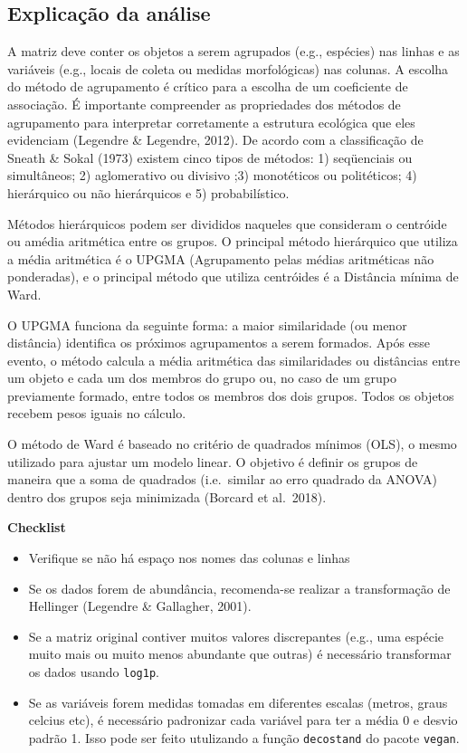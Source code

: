\documentclass[
]{book}
\providecommand{\tightlist}{%
  \setlength{\itemsep}{0pt}\setlength{\parskip}{0pt}}
\begin{document}
\hypertarget{explicauxe7uxe3o-da-anuxe1lise}{%
\subsection{Explicação da análise}\label{explicauxe7uxe3o-da-anuxe1lise}}

A matriz deve conter os objetos a serem agrupados (e.g., espécies) nas linhas e as variáveis (e.g., locais de coleta ou medidas morfológicas) nas colunas.
A escolha do método de agrupamento é crítico para a escolha de um coeficiente de associação. É importante compreender as propriedades dos métodos de agrupamento para interpretar corretamente a estrutura ecológica que eles evidenciam (Legendre \& Legendre, 2012). De acordo com a classificação de Sneath \& Sokal (1973) existem cinco tipos de métodos: 1) seqüenciais ou simultâneos; 2) aglomerativo ou divisivo ;3) monotéticos ou politéticos; 4) hierárquico ou não hierárquicos e 5) probabilístico.

Métodos hierárquicos podem ser divididos naqueles que consideram o centróide ou amédia aritmética entre os grupos. O principal método hierárquico que utiliza a média aritmética é o UPGMA (Agrupamento pelas médias aritméticas não ponderadas), e o principal método que utiliza centróides é a Distância mínima de Ward.

O UPGMA funciona da seguinte forma: a maior similaridade (ou menor distância) identifica os próximos agrupamentos a serem formados. Após esse evento, o método calcula a média aritmética das similaridades ou distâncias entre um objeto e cada um dos membros do grupo ou, no caso de um grupo previamente formado, entre todos os membros dos dois grupos. Todos os objetos recebem pesos iguais no cálculo.

O método de Ward é baseado no critério de quadrados mínimos (OLS), o mesmo utilizado para ajustar um modelo linear. O objetivo é definir os grupos de maneira que a soma de quadrados (i.e.~similar ao erro quadrado da ANOVA) dentro dos grupos seja minimizada (Borcard et al.~2018).

\textbf{Checklist}

\begin{itemize}
\tightlist
\item
  Verifique se não há espaço nos nomes das colunas e linhas
\item
  Se os dados forem de abundância, recomenda-se realizar a transformação de Hellinger (Legendre \& Gallagher, 2001).
\item
  Se a matriz original contiver muitos valores discrepantes (e.g., uma espécie muito mais ou muito menos abundante que outras) é necessário transformar os dados usando \texttt{log1p}.
\item
  Se as variáveis forem medidas tomadas em diferentes escalas (metros, graus celcius etc), é necessário padronizar cada variável para ter a média 0 e desvio padrão 1. Isso pode ser feito utulizando a função \texttt{decostand} do pacote \texttt{vegan}.
\end{itemize}
\end{document}
